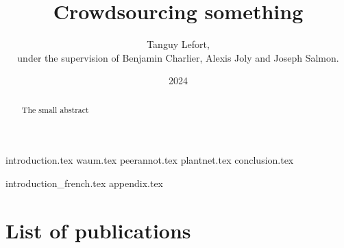 \documentclass[
a4paper, %
11pt, %
onecolumn, %
openright, %
]{memoir}
\date{2024}
\author{Tanguy Lefort, \\[.5cm] under the supervision of Benjamin Charlier, Alexis Joly and Joseph Salmon.\\[.5cm] }
\title{Crowdsourcing something}
\begin{document}
\frontmatter

\maketitle

\thispagestyle{empty}
\begin{abstract}
The small abstract
\end{abstract}
\clearpage






\clearpage

\begingroup
\setlength\afterchapskip{2cm}

\tableofcontents*
\endgroup
\clearpage

\mainmatter

{introduction.tex}
{waum.tex}
{peerannot.tex}
{plantnet.tex}
{conclusion.tex}

\appendix

{introduction_french.tex}
{appendix.tex}
\backmatter


\chapter*{List of publications}




\end{document}
